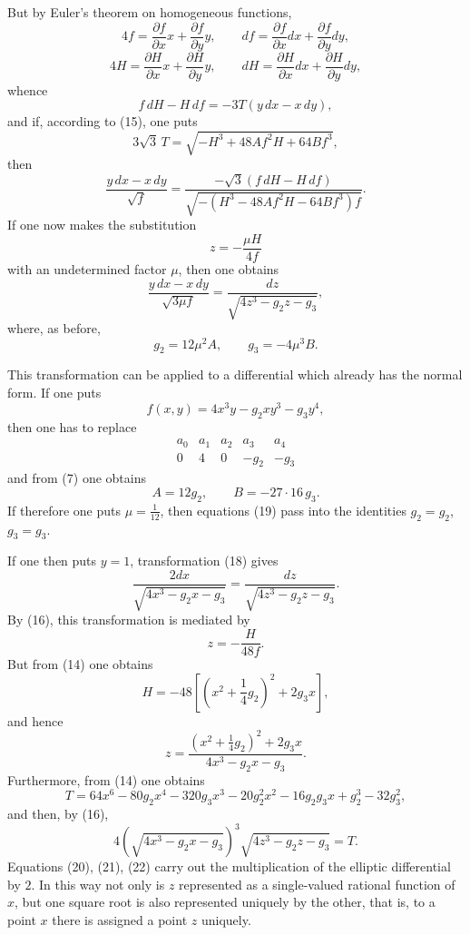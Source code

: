 \documentclass[11pt]{article}
\begin{document}
But by Euler's theorem on homogeneous functions,
\[
4f=\frac{\partial f}{\partial x}x+\frac{\partial f}{\partial y}y,
\qquad
df=\frac{\partial f}{\partial x}dx+\frac{\partial f}{\partial y}dy,
\]
\[
4H=\frac{\partial H}{\partial x}x+\frac{\partial H}{\partial y}y,
\qquad
dH=\frac{\partial H}{\partial x}dx+\frac{\partial H}{\partial y}dy,
\]
whence
\[
f\,dH-H\,df=-3T(y\,dx-x\,dy),
\]
and if, according to (15), one puts
\begin{equation}
3\sqrt3\,T=\sqrt{-H^3+48Af^2H+64Bf^3},
\tag{16}
\end{equation}
then
\[
\frac{y\,dx-x\,dy}{\sqrt f}=\frac{-\sqrt3(f\,dH-H\,df)}{\sqrt{-(H^3-48Af^2H-64Bf^3)f}}.
\]
If one now makes the substitution
\begin{equation}
z=-\frac{\mu H}{4f}
\tag{17}
\end{equation}
with an undetermined factor $\mu$, then one obtains
\begin{equation}
\frac{y\,dx-x\,dy}{\sqrt{3\mu f}}=\frac{dz}{\sqrt{4z^3-g_2z-g_3}},
\tag{18}
\end{equation}
where, as before,
\begin{equation}
g_2=12\mu^2A,\qquad g_3=-4\mu^3B.
\tag{19}
\end{equation}

This transformation can be applied to a differential which already has the normal form. If one puts
\[
f(x,y)=4x^3y-g_2xy^3-g_3y^4,
\]
then one has to replace
\[
\begin{array}{ccccc}
a_0&a_1&a_2&a_3&a_4\\
0&4&0&-g_2&-g_3
\end{array}
\]
and from (7) one obtains
\[
A=12g_2,
\qquad B=-27\cdot16\,g_3.
\]
If therefore one puts $\mu=\frac1{12}$, then equations (19) pass into the identities $g_2=g_2$, $g_3=g_3$.

If one then puts $y=1$, transformation (18) gives
\begin{equation}
\frac{2dx}{\sqrt{4x^3-g_2x-g_3}}=\frac{dz}{\sqrt{4z^3-g_2z-g_3}}.
\tag{20}
\end{equation}
By (16), this transformation is mediated by
\[
z=-\frac{H}{48f}.
\]
But from (14) one obtains
\[
H=-48\left[\left(x^2+\frac14g_2\right)^2+2g_3x\right],
\]
and hence
\begin{equation}
z=\frac{\left(x^2+\frac14g_2\right)^2+2g_3x}{4x^3-g_2x-g_3}.
\tag{21}
\end{equation}
Furthermore, from (14) one obtains
\[
T=64x^6-80g_2x^4-320g_3x^3-20g_2^2x^2-16g_2g_3x+g_2^3-32g_3^2,
\]
and then, by (16),
\begin{equation}
4\left(\sqrt{4x^3-g_2x-g_3}\right)^3\sqrt{4z^3-g_2z-g_3}=T.
\tag{22}
\end{equation}
Equations (20), (21), (22) carry out the multiplication of the elliptic differential by $2$. In this way not only is $z$ represented as a single-valued rational function of $x$, but one square root is also represented uniquely by the other, that is, to a point $x$ there is assigned a point $z$ uniquely.
\end{document}
